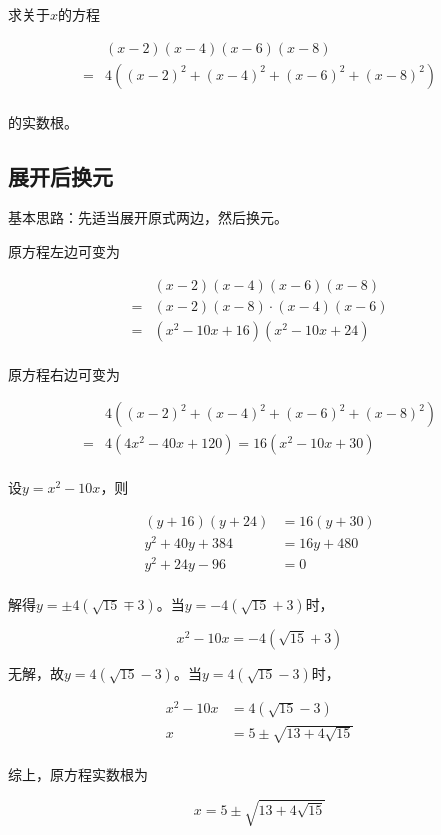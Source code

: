 

求关于$x$的方程

\begin{align*}
  & (x - 2)(x - 4)(x - 6)(x - 8) \\
  ={}& 4\left((x - 2)^2 + (x - 4)^2 + (x - 6)^2 + (x - 8)^2\right) \\
\end{align*}

的实数根。


\subsection{展开后换元}

基本思路：先适当展开原式两边，然后换元。

原方程左边可变为

\begin{align*}
  & (x - 2)(x - 4)(x - 6)(x - 8) \\
  ={}& (x - 2)(x - 8)\cdot(x - 4)(x - 6) \\
  ={}& (x^2 - 10x + 16)(x^2 - 10x + 24) \\
\end{align*}

原方程右边可变为

\begin{align*}
  & 4\left((x - 2)^2 + (x - 4)^2 + (x - 6)^2 + (x - 8)^2\right) \\
  ={}& 4(4x^2 - 40x + 120) = 16(x^2 - 10x + 30) \\
\end{align*}

设$y = x^2 - 10x$，则

\begin{align*}
  (y + 16)(y + 24) &= 16(y + 30) \\
  y^2 + 40y + 384 &= 16y + 480 \\
  y^2 + 24y - 96 &= 0 \\
\end{align*}

解得$y = \pm4(\sqrt{15} \mp3)$。当$y = -4(\sqrt{15} + 3)$时，

\[ x^2 - 10x = -4(\sqrt{15} + 3) \]

无解，故$y = 4(\sqrt{15} - 3)$。当$y = 4(\sqrt{15} - 3)$时，

\begin{align*}
  x^2 - 10x &= 4(\sqrt{15} - 3) \\
  x &= 5 \pm\sqrt{13 + 4\sqrt{15}} \\
\end{align*}

综上，原方程实数根为

\[ x = 5 \pm\sqrt{13 + 4\sqrt{15}} \]
